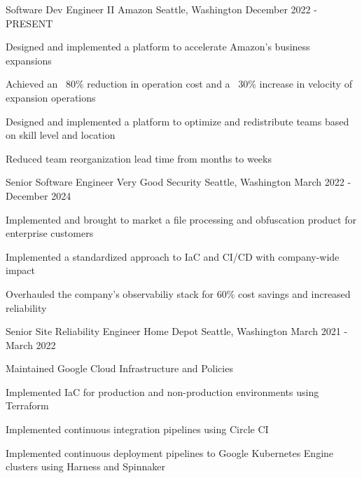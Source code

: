 


\begin{cventries}

\cventry
{Software Dev Engineer II} %
{Amazon} %
{Seattle, Washington} %
{December 2022 - PRESENT} %
{ %
\begin{cvitems}
\item{Designed and implemented a platform to accelerate Amazon's business expansions}
\item{Achieved an ~80\% reduction in operation cost and a ~30\% increase in velocity of expansion operations}
\item{Designed and implemented a platform to optimize and redistribute teams based on skill level and location}
\item{Reduced team reorganization lead time from months to weeks}
\end{cvitems}
}

\cventry
{Senior Software Engineer} %
{Very Good Security} %
{Seattle, Washington} %
{March 2022 - December 2024} %
{ %
\begin{cvitems}
\item{Implemented and brought to market a file processing and obfuscation product for enterprise customers}
\item{Implemented a standardized approach to IaC and CI/CD with company-wide impact}
\item{Overhauled the company's observabiliy stack for 60\% cost savings and increased reliability}
\end{cvitems}
}


\cventry
{Senior Site Reliability Engineer} %
{Home Depot} %
{Seattle, Washington} %
{March 2021 - March 2022} %
{ %
\begin{cvitems}
\item {Maintained Google Cloud Infrastructure and Policies}
\item {Implemented IaC for production and non-production environments using Terraform}
\item {Implemented continuous integration pipelines using Circle CI}
\item {Implemented continuous deployment pipelines to Google Kubernetes Engine clusters using Harness and Spinnaker}
\end{cvitems}
}


\end{cventries}
